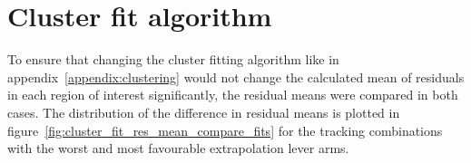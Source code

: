\section{Cluster fit algorithm}
\label{appendix:systematics_cluster_fit_fcn}
To ensure that changing the cluster fitting algorithm like in appendix~\ref{appendix:clustering} would not change the calculated mean of residuals in each region of interest significantly, the residual means were compared in both cases. The distribution of the difference in residual means is plotted in figure~\ref{fig:cluster_fit_res_mean_compare_fits} for the tracking combinations with the worst and most favourable extrapolation lever arms.

